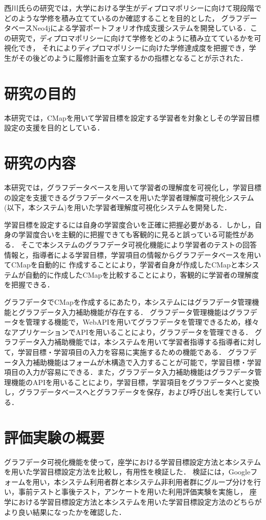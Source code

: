 西川氏らの研究では，大学における学生がディプロマポリシーに向けて現段階でどのような学修を積み立てているのか確認することを目的とした，
グラフデータベースNeo4jによる学習ポートフォリオ作成支援システムを開発している\cite{nisi}．この研究で，ディプロマポリシーに向けて学修をどのように積み立てているかを可視化でき，
それによりディプロマポリシーに向けた学修達成度を把握でき，学生がその後どのように履修計画を立案するかの指標となることが示された．

\section{研究の目的}
本研究では，CMapを用いて学習目標を設定する学習者を対象としその学習目標設定の支援を目的としている．

\section{研究の内容}
本研究では，グラフデータベースを用いて学習者の理解度を可視化し，学習目標の設定を支援できるグラフデータベースを用いた学習者理解度可視化システム(以下，本システム)を用いた学習者理解度可視化システムを開発した．

学習目標を設定するには自身の学習度合いを正確に把握必要がある．しかし，自身の学習度合いを主観的に把握できても客観的に見ると誤っている可能性がある．
そこで本システムのグラフデータ可視化機能により学習者のテストの回答情報と，指導者による学習目標，学習項目の情報からグラフデータベースを用いてCMapを自動的に
作成することにより，学習者自身が作成したCMapと本システムが自動的に作成したCMapを比較することにより，客観的に学習者の理解度を把握できる．

グラフデータでCMapを作成するにあたり，本システムにはグラフデータ管理機能とグラフデータ入力補助機能が存在する．
グラフデータ管理機能はグラフデータを管理する機能で，WebAPIを用いてグラフデータを管理できるため，様々なアプリケーションでAPIを用いることにより，グラフデータを管理できる．
グラフデータ入力補助機能では，本システムを用いて学習者指導する指導者に対して，学習目標・学習項目の入力を容易に実施するための機能である．
グラフデータ入力補助機能はフォームが木構造で入力することが可能で，学習目標・学習項目の入力が容易にできる．また，グラフデータ入力補助機能はグラフデータ管理機能のAPIを用いることにより，学習目標，学習項目をグラフデータへと変換し，グラフデータベースへとグラフデータを保存，および呼び出しを実行している．


\section{評価実験の概要}
グラフデータ可視化機能を使って，座学における学習目標設定方法と本システムを用いた学習目標設定方法を比較し，有用性を検証した．
検証には，Googleフォームを用い，本システム利用者群と本システム非利用者群にグループ分けを行い，事前テストと事後テスト，アンケートを用いた利用評価実験を実施し，
座学における学習目標設定方法と本システムを用いた学習目標設定方法のどちらがより良い結果になったかを確認した．

